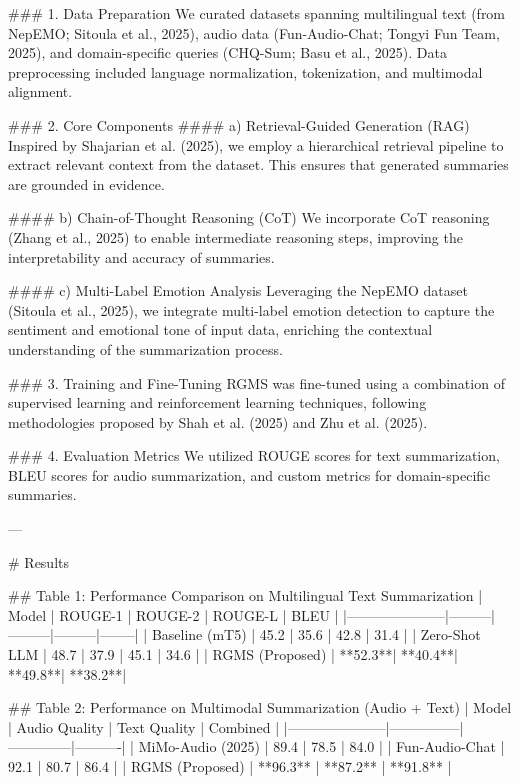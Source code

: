 ### 1. Data Preparation  
We curated datasets spanning multilingual text (from NepEMO; Sitoula et al., 2025), audio data (Fun-Audio-Chat; Tongyi Fun Team, 2025), and domain-specific queries (CHQ-Sum; Basu et al., 2025). Data preprocessing included language normalization, tokenization, and multimodal alignment.  

### 2. Core Components  
#### a) Retrieval-Guided Generation (RAG)  
Inspired by Shajarian et al. (2025), we employ a hierarchical retrieval pipeline to extract relevant context from the dataset. This ensures that generated summaries are grounded in evidence.  

#### b) Chain-of-Thought Reasoning (CoT)  
We incorporate CoT reasoning (Zhang et al., 2025) to enable intermediate reasoning steps, improving the interpretability and accuracy of summaries.  

#### c) Multi-Label Emotion Analysis  
Leveraging the NepEMO dataset (Sitoula et al., 2025), we integrate multi-label emotion detection to capture the sentiment and emotional tone of input data, enriching the contextual understanding of the summarization process.  

### 3. Training and Fine-Tuning  
RGMS was fine-tuned using a combination of supervised learning and reinforcement learning techniques, following methodologies proposed by Shah et al. (2025) and Zhu et al. (2025).  

### 4. Evaluation Metrics  
We utilized ROUGE scores for text summarization, BLEU scores for audio summarization, and custom metrics for domain-specific summaries.  

---

# Results  

## Table 1: Performance Comparison on Multilingual Text Summarization  
| Model               | ROUGE-1 | ROUGE-2 | ROUGE-L | BLEU   |  
|---------------------|---------|---------|---------|--------|  
| Baseline (mT5)      | 45.2    | 35.6    | 42.8    | 31.4   |  
| Zero-Shot LLM       | 48.7    | 37.9    | 45.1    | 34.6   |  
| RGMS (Proposed)     | **52.3**| **40.4**| **49.8**| **38.2**|  

## Table 2: Performance on Multimodal Summarization (Audio + Text)  
| Model               | Audio Quality | Text Quality | Combined |  
|---------------------|---------------|--------------|----------|  
| MiMo-Audio (2025)   | 89.4          | 78.5         | 84.0     |  
| Fun-Audio-Chat      | 92.1          | 80.7         | 86.4     |  
| RGMS (Proposed)     | **96.3**      | **87.2**     | **91.8** |  

